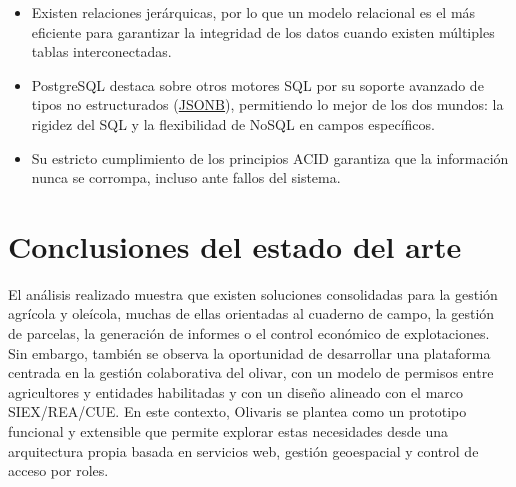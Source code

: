 \begin{itemize}
    \begin{itemize}
        \item Existen relaciones jerárquicas, por lo que un modelo relacional es el más eficiente para garantizar la integridad de los datos cuando existen múltiples 
        tablas interconectadas.
        \item PostgreSQL destaca sobre otros motores SQL por su soporte avanzado de tipos no estructurados (\hyperlink{jsonb}{JSONB}), permitiendo lo mejor de los dos 
        mundos: la rigidez del SQL y la flexibilidad de NoSQL en campos específicos.
        \item Su estricto cumplimiento de los principios ACID garantiza que la información nunca se corrompa, 
        incluso ante fallos del sistema.
    \end{itemize}
\end{itemize}

\section{Conclusiones del estado del arte}

El análisis realizado muestra que existen soluciones consolidadas para la gestión agrícola y oleícola, muchas de ellas orientadas al cuaderno de campo, la gestión de 
parcelas, la generación de informes o el control económico de explotaciones. Sin embargo, también se observa la oportunidad de desarrollar una plataforma centrada en 
la gestión colaborativa del olivar, con un modelo de permisos entre agricultores y entidades habilitadas y con un diseño alineado con el marco SIEX/REA/CUE. En este 
contexto, Olivaris se plantea como un prototipo funcional y extensible que permite explorar estas necesidades desde una arquitectura propia basada en servicios web, 
gestión geoespacial y control de acceso por roles.

